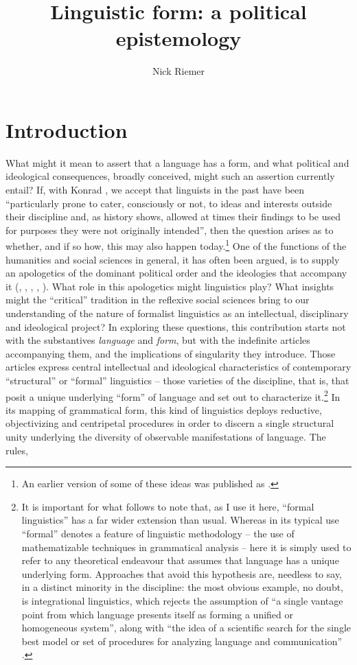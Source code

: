 \documentclass[output=paper]{langscibook}
\author{Nick Riemer \affiliation{The University of Sydney \& Laboratoire d’histoire des théories linguistiques, Université Paris-Diderot}}
\title{Linguistic form: a political epistemology}
\begin{document}
\maketitle

\section{Introduction}
\label{sec:riemer:intro}

What might it mean to assert that a language has a form, and what political and ideological consequences, broadly conceived, might such an assertion currently entail? If, with Konrad \citet{Koerner1999}, we accept that linguists in the past have been ``particularly prone to cater, consciously or not, to ideas and interests outside their discipline and, as history shows, allowed at times their findings to be used for purposes they were not originally intended'', then the question arises as to whether, and if so how, this may also happen today.\footnote{An earlier version of some of these ideas was published as \citet{Riemer2016div}.} One of the functions of the humanities and social sciences in general, it has often been argued, is to supply an apologetics of the dominant political order and the ideologies that accompany it (\citealt{Nizan19711932}, \citealt{Chomsky19781967}, \citealt{Ingleby1972}, \citealt{Baudrillard19881972}, \citealt{Bourdieu1991}). What role in this apologetics might linguistics play? What insights might the ``critical'' tradition in the reflexive social sciences bring to our understanding of the nature of formalist linguistics as an intellectual, disciplinary and ideological project? In exploring these questions, this contribution starts not with the substantives \emph{language} and \emph{form}, but with the indefinite articles accompanying them, and the implications of singularity they introduce. Those articles express central intellectual and ideological characteristics of contemporary ``structural'' or ``formal'' linguistics – those varieties of the discipline, that is, that posit a unique underlying ``form'' of language and set out to characterize it.\footnote{It is important for what follows to note that, as I use it here, ``formal linguistics'' has a far wider extension than usual. Whereas in its typical use ``formal'' denotes a feature of linguistic methodology – the use of mathematizable techniques in grammatical analysis – here it is simply used to refer to any theoretical endeavour that assumes that language has a unique underlying form. Approaches that avoid this hypothesis are, needless to say, in a distinct minority in the discipline: the most obvious example, no doubt, is integrational linguistics, which rejects the assumption of ``a single vantage point from which language presents itself as forming a unified or homogeneous system'', along with ``the idea of a scientific search for the single best model or set of procedures for analyzing language and communication'' \citep[4, 15]{PableHutton2015}.} In its mapping of grammatical form, this kind of  linguistics deploys reductive, objectivizing and centripetal procedures in order to discern a single structural unity underlying the diversity of observable manifestations of language. The rules, 
\end{document}

